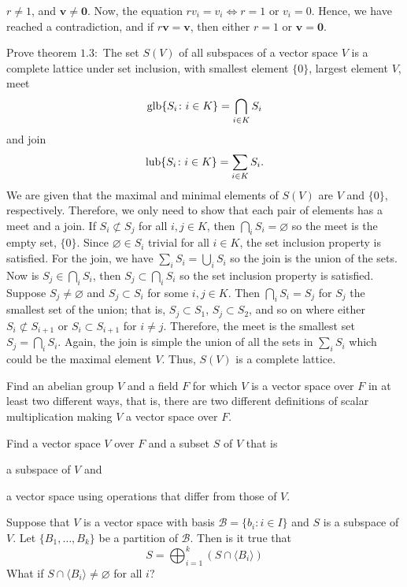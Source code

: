 \begin{exercise}
  \(r\neq 1\), and \(\mathbold{v}\neq \mathbold{0}\).
  Now, the equation \(rv_i = v_i\iff r = 1\) or \(v_i = 0\).
  Hence, we have reached a contradiction, and if
  \(r\mathbold{v} = \mathbold{v}\), then either \(r = 1\) or
  \(\mathbold{v} = \mathbold{0}\).
\item
  Prove theorem \(1.3:\) The set \(S(V)\) of all subspaces of a vector space
  \(V\) is a complete lattice under set inclusion, with smallest element
  \(\{0\}\), largest element \(V\), meet
  \[
    \operatorname{glb}\{S_i\colon i\in K\} = \bigcap_{i\in K}S_i
  \]
  and join
  \[
    \operatorname{lub}\{S_i\colon i\in K\} = \sum_{i\in K}S_i.
  \]
  We are given that the maximal and minimal elements of \(S(V)\) are \(V\) and
  \(\{0\}\), respectively.
  Therefore, we only need to show that each pair of elements has a meet and a
  join.
  If \(S_i\not\subset S_j\) for all \(i,j\in K\), then
  \(\bigcap_i S_i = \varnothing\) so the meet is the empty set, \(\{0\}\).
  Since \(\varnothing\in S_i\) trivial for all \(i\in K\), the set inclusion
  property is satisfied.
  For the join, we have \(\sum_iS_i = \bigcup_iS_i\) so the join is the union
  of the sets.
  Now is \(S_j\in\bigcap_iS_i\), then \(S_j\subset\bigcap_iS_i\) so the set
  inclusion property is satisfied.
  Suppose \(S_j\neq\varnothing\) and \(S_j\subset S_i\) for some \(i,j\in K\).
  Then \(\bigcap_iS_i = S_j\) for \(S_j\) the smallest set of the union; that
  is, \(S_j\subset S_1\), \(S_j\subset S_2\), and so on where either
  \(S_i\not\subset S_{i + 1}\) or \(S_i\subset S_{i + 1}\) for \(i\neq j\).
  Therefore, the meet is the smallest set \(S_j = \bigcap_iS_i\).
  Again, the join is simple the union of all the sets in \(\sum_iS_i\) which
  could be the maximal element \(V\).
  Thus, \(S(V)\) is a complete lattice.
\item
  \begin{exercise}[label = (\alph*)]
  \item
    Find an abelian group \(V\) and a field \(F\) for which \(V\) is a vector
    space over \(F\) in at least two different ways, that is, there are two
    different definitions of scalar multiplication making \(V\) a vector space
    over \(F\).
  \item
    Find a vector space \(V\) over \(F\) and a subset \(S\) of \(V\) that is
    \begin{enumerate*}[label = (\arabic*)]
    \item
      a subspace of \(V\) and
    \item
      a vector space using operations that differ from those of \(V\).
    \end{enumerate*}
  \end{exercise}
\item
  Suppose that \(V\) is a vector space with basis
  \(\mathcal{B} = \{b_i\colon i\in I\}\) and \(S\) is a subspace of \(V\).
  Let \(\{B_1,\ldots,B_k\}\) be a partition of \(\mathcal{B}\).
  Then is it true that
  \[
    S = \bigoplus_{i = 1}^k(S\cap\langle B_i\rangle)
  \]
  What if \(S\cap\langle B_i\rangle\neq\varnothing\) for all \(i\)?
\end{exercise}

